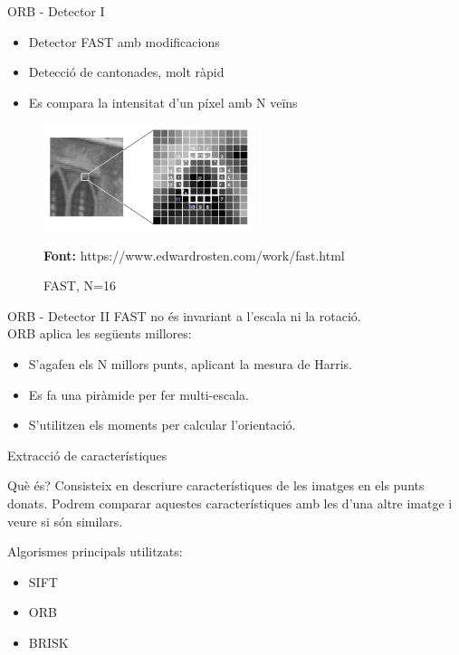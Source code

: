 \documentclass[xcolor=table, 11pt]{beamer}
\newcommand*{\captionsource}[2]{%
  \caption[{#1}]{#1}\par
  \vspace{-0.4cm}
  \tiny{\textbf{Font:} #2\par}}
\newcommand\tz{\fontsize{13}{15.6}\selectfont}
\begin{document}
	\begin{frame}{ORB - Detector I}
		\tz
		\begin{itemize}
			\item{Detector FAST\cite{Rosten:2006:MLH:2094437.2094478} amb modificacions}
			\item{Detecció de cantonades, molt ràpid}
			\item{Es compara la intensitat d'un píxel amb N veïns}
		\end{itemize}
		\begin{figure}[H]
			\centering
			\includegraphics[width=0.55\textwidth]{images/fast}
			\captionsource{FAST, N=16}{https://www.edwardrosten.com/work/fast.html}
		\end{figure}
	\end{frame}

	\begin{frame}{ORB - Detector II}
		\tz
		\alert{FAST no és invariant a l'escala ni la rotació.}\\
		\vspace{0.5cm}
		ORB aplica les següents millores:\\

		\begin{itemize}
			\item{S'agafen els N millors punts, aplicant la mesura de Harris.}
			\item{Es fa una piràmide per fer multi-escala.}
			\item{S'utilitzen els moments per calcular l'orientació.}
		\end{itemize}
	\end{frame}

	\begin{frame}{Extracció de característiques}
		\tz
		\begin{block}{Què és?}
			Consisteix en descriure característiques de les imatges en els punts donats. Podrem comparar aquestes característiques amb les d'una altre imatge i veure si són similars.
		\end{block}
		Algorismes principals utilitzats:
		\begin{itemize}
			\item SIFT
			\item ORB
			\item BRISK\cite{Leutenegger:2011:BBR:2355573.2356277}
		\end{itemize}
	\end{frame}
\end{document}
